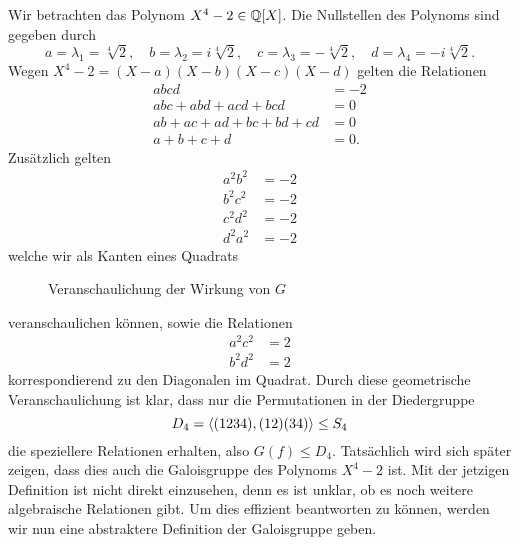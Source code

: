 \documentclass{book}
\begin{document}
\begin{exa}
    \label{exa:d4}
    Wir betrachten das Polynom $X^4 - 2 \in \mathbb{Q}[X]$. Die Nullstellen des
    Polynoms sind gegeben durch
    \[
        a=\lambda_1=\sqrt[4]{2},\quad b=\lambda_2=i\sqrt[4]{2},\quad c=\lambda_3=-\sqrt[4]{2},\quad d=\lambda_4=-i\sqrt[4]{2}.
    \]
    Wegen $X^4 - 2 = (X-a)(X-b)(X-c)(X-d)$ gelten die Relationen
    \begin{align*}
        abcd & = -2\\
        abc + abd + acd + bcd & = 0 \\
        ab + ac + ad + bc + bd + cd & = 0\\
        a + b + c + d & = 0.
    \end{align*}
	Zus\"atzlich gelten 
    \begin{align}
        a^2b^2 & = -2\\
        b^2c^2 & = -2\\
        c^2d^2 & = -2\\
        d^2a^2 & = -2
    \end{align}
    welche wir als Kanten eines Quadrats 
\begin{figure}[htpb]
    \centering
    \caption{Veranschaulichung der Wirkung von $G$}%
    \label{fig:square}
    \end{figure}
    veranschaulichen können, sowie die Relationen
    \begin{align}
        a^2c^2 & = 2\\
        b^2d^2 & = 2
    \end{align}
    korrespondierend zu den Diagonalen im Quadrat. Durch diese geometrische
    Veranschaulichung ist klar, dass nur die Permutationen in der Diedergruppe
    \[
        D_4 = \langle  (1234), (12)(34)  \rangle \le S_4
    \]
    die speziellere Relationen erhalten, also $G(f) \le D_4$. Tatsächlich wird
    sich später zeigen, dass dies auch die Galoisgruppe des Polynoms $X^4 -2$
    ist. Mit der jetzigen Definition ist nicht direkt einzusehen, denn es ist
    unklar, ob es noch weitere algebraische Relationen gibt. Um dies effizient
    beantworten zu können, werden wir nun eine abstraktere Definition der
    Galoisgruppe geben.
\end{exa}
\end{document}

